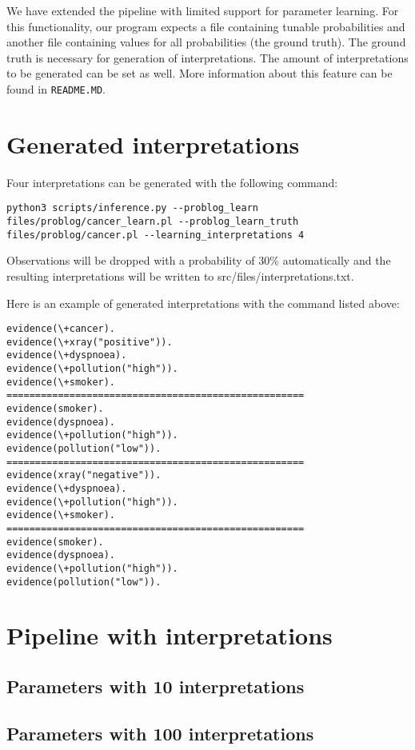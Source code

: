 We have extended the pipeline with limited support for parameter learning. For this functionality, our program expects a file containing tunable probabilities and another file containing values for all probabilities (the ground truth). The ground truth is necessary for generation of interpretations. The amount of interpretations to be generated can be set as well. More information about this feature can be found in \texttt{README.MD}.

\section{Generated interpretations}
Four interpretations can be generated with the following command:
\begin{lstlisting}
python3 scripts/inference.py --problog_learn files/problog/cancer_learn.pl --problog_learn_truth files/problog/cancer.pl --learning_interpretations 4
\end{lstlisting}
Observations will be dropped with a probability of 30\% automatically and the resulting interpretations will be written to src/files/interpretations.txt.

Here is an example of generated interpretations with the command listed above:
\begin{lstlisting}
evidence(\+cancer).
evidence(\+xray("positive")).
evidence(\+dyspnoea).
evidence(\+pollution("high")).
evidence(\+smoker).
====================================================
evidence(smoker).
evidence(dyspnoea).
evidence(\+pollution("high")).
evidence(pollution("low")).
====================================================
evidence(xray("negative")).
evidence(\+dyspnoea).
evidence(\+pollution("high")).
evidence(\+smoker).
====================================================
evidence(smoker).
evidence(dyspnoea).
evidence(\+pollution("high")).
evidence(pollution("low")).
\end{lstlisting}

\section{Pipeline with interpretations}
\subsection{Parameters with 10 interpretations}

\subsection{Parameters with 100 interpretations}

